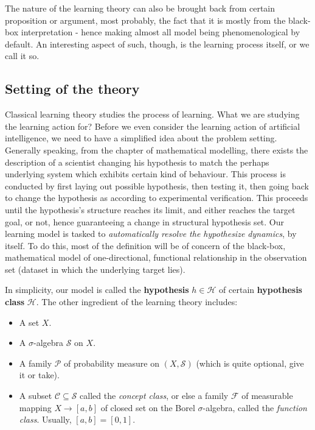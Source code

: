 The nature of the learning theory can also be brought back from certain proposition or argument, most probably, the fact that it is mostly from the black-box interpretation - hence making almost all model being phenomenological by default. An interesting aspect of such, though, is the learning process itself, or we call it so. 
\subsection{Setting of the theory}

Classical learning theory studies the process of learning. What we are studying the learning action for? Before we even consider the learning action of artificial intelligence, we need to have a simplified idea about the problem setting. Generally speaking, from the chapter of mathematical modelling, there exists the description of a scientist changing his hypothesis to match the perhaps underlying system which exhibits certain kind of behaviour. This process is conducted by first laying out possible hypothesis, then testing it, then going back to change the hypothesis as according to experimental verification. This proceeds until the hypothesis's structure reaches its limit, and either reaches the target goal, or not, hence guaranteeing a change in structural hypothesis set. Our learning model is tasked to \textit{automatically resolve the hypothesize dynamics}, by itself. To do this, most of the definition will be of concern of the black-box, mathematical model of one-directional, functional relationship in the observation set (dataset in which the underlying target lies). 

In simplicity, our model is called the \textbf{hypothesis} $h\in \mathcal{H}$ of certain \textbf{hypothesis class} $\mathcal{H}$. The other ingredient of the learning theory includes: 
\begin{itemize}[noitemsep,topsep=1pt]
    \item A set $X$. 
    \item A $\sigma$-algebra $\mathcal{S}$ on $X$. 
    \item A family $\mathcal{P}$ of probability measure on $(X,\mathcal{S})$ (which is quite optional, give it or take). 
    \item A subset $\mathcal{C}\subseteq \mathcal{S}$ called the \textit{concept class}, or else a family $\mathcal{F}$ of measurable mapping $X\to [a,b]$ of closed set on the Borel $\sigma$-algebra, called the \textit{function class}. Usually, $[a,b]=[0,1]$. 
\end{itemize}

